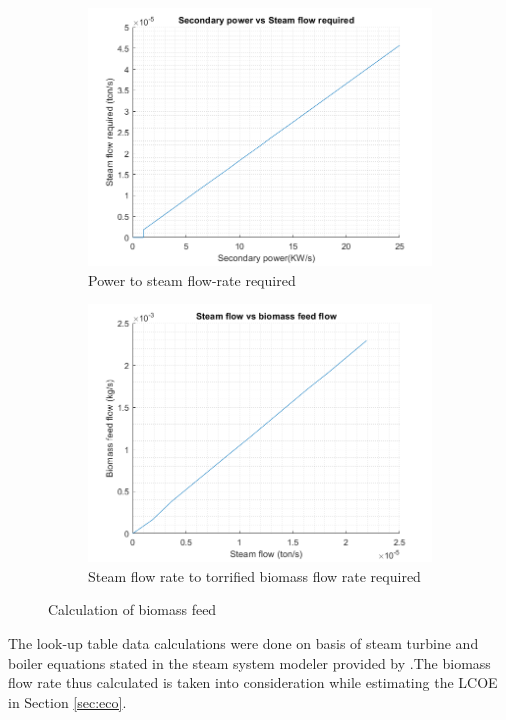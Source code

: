 \begin{figure}[H]
\begin{subfigure}{.5\textwidth}
  \centering
  \includegraphics[width=.8\linewidth]{Final_report/Images/power_to_steam_req.png}
  \caption{Power to steam flow-rate required}
  \label{fig:P_to_S}
\end{subfigure}
\begin{subfigure}{.5\textwidth}
  \centering
  \includegraphics[width=.8\linewidth]{Final_report/Images/steam_to_biomass.png}  
  \caption{Steam flow rate to torrified biomass flow rate required}
  \label{fig:S_to_B}
\end{subfigure}
\caption{Calculation of biomass feed}
\label{fig:calculation_feed}
\end{figure}

\noindent The look-up table data calculations were done on basis of steam turbine and boiler equations stated in the steam system modeler provided by \citep{advanced}.The biomass flow rate thus calculated is taken into consideration while estimating the LCOE in Section \ref{sec:eco}. 


